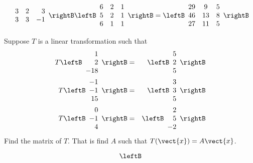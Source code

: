 \begin{enumialphparenastyle}
\begin{ex}
\begin{sol}
\[\begin{array}{rrr}
3 & 2 & 3 \\
3 & 3 & -1
\end{array}
\rightB \leftB
\begin{array}{ccc}
6 & 2 & 1 \\
5 & 2 & 1 \\
6 & 1 & 1
\end{array}
\rightB =\allowbreak \leftB
\begin{array}{ccc}
29 & 9 & 5 \\
46 & 13 & 8 \\
27 & 11 & 5
\end{array}
\rightB 
\]
\end{sol}
\end{ex}

\begin{ex} Suppose $T$ is a linear transformation such that
\begin{eqnarray*}
T\leftB
\begin{array}{r}
1 \\
2 \\
-18
\end{array}
\rightB &=&\leftB
\begin{array}{r}
5 \\
2 \\
5
\end{array}
\rightB \\
T\leftB
\begin{array}{r}
-1 \\
-1 \\
15
\end{array}
\rightB &=&\leftB
\begin{array}{r}
3 \\
3 \\
5
\end{array}
\rightB \\
T\leftB
\begin{array}{r}
0 \\
-1 \\
4
\end{array}
\rightB &=&\leftB
\begin{array}{r}
2 \\
5 \\
-2
\end{array}
\rightB
\end{eqnarray*}
Find the matrix of $T$. That is find $A$ such that $T(\vect{x})=A\vect{x}$. \vspace{1mm}
\begin{sol}
\[
\leftB
\begin{array}{rrr}

\end{array}\]
\end{sol}
\end{ex}
\end{enumialphparenastyle}
